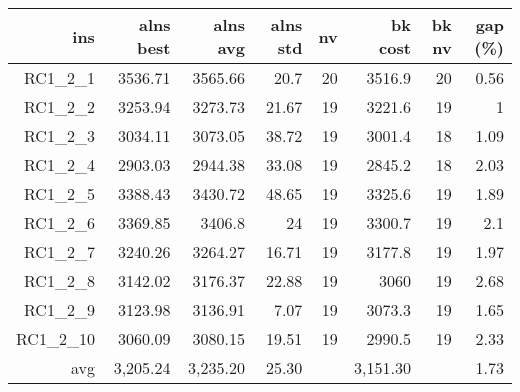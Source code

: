   \begin{table}[caption={Kết quả đo với tập HG\_RC\_1\_2 200 yêu cầu}, label=exp:HGRC12]
    \centering
    \begin{tabular}{rrrrrrrr}
    \hline
    ins & alns best & alns avg & alns std & nv & bk cost & bk nv & gap (\%) \\ \hline
    RC1\_2\_1 & 3536.71 & 3565.66 & 20.7 & 20 & 3516.9 & 20 & 0.56 \\ \hline
    RC1\_2\_2 & 3253.94 & 3273.73 & 21.67 & 19 & 3221.6 & 19 & 1 \\ \hline
    RC1\_2\_3 & 3034.11 & 3073.05 & 38.72 & 19 & 3001.4 & 18 & 1.09 \\ \hline
    RC1\_2\_4 & 2903.03 & 2944.38 & 33.08 & 19 & 2845.2 & 18 & 2.03 \\ \hline
    RC1\_2\_5 & 3388.43 & 3430.72 & 48.65 & 19 & 3325.6 & 19 & 1.89 \\ \hline
    RC1\_2\_6 & 3369.85 & 3406.8 & 24 & 19 & 3300.7 & 19 & 2.1 \\ \hline
    RC1\_2\_7 & 3240.26 & 3264.27 & 16.71 & 19 & 3177.8 & 19 & 1.97 \\ \hline
    RC1\_2\_8 & 3142.02 & 3176.37 & 22.88 & 19 & 3060 & 19 & 2.68 \\ \hline
    RC1\_2\_9 & 3123.98 & 3136.91 & 7.07 & 19 & 3073.3 & 19 & 1.65 \\ \hline
    RC1\_2\_10 & 3060.09 & 3080.15 & 19.51 & 19 & 2990.5 & 19 & 2.33 \\ \hline
    avg & 3,205.24 & 3,235.20 & 25.30 & & 3,151.30 & & 1.73 \\ \hline
    \end{tabular}
  \end{table}

